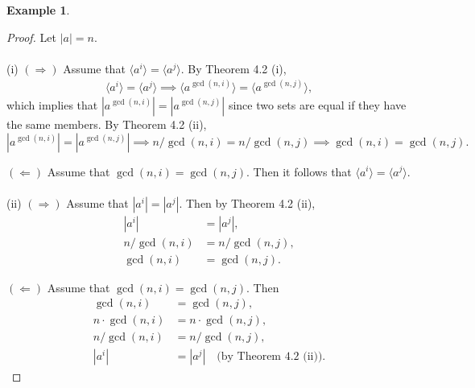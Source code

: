 \documentclass{article}
\newtheorem{corollary}{Corollary}[theorem]
\theoremstyle{definition}
\newtheorem{example}{Example}[section]
\begin{document}
\begin{example}
    \noindent{}
    \begin{proof}
        Let $|a|=n$.
        \\ \\
        (i) $(\Rightarrow)$ Assume that $\langle a^i \rangle = \langle a^j \rangle$. By Theorem 4.2 (i),
        \begin{align*}
            \langle a^i \rangle = \langle a^j \rangle \implies \langle a^{\gcd(n,i)} \rangle = \langle a^{\gcd(n,j)} \rangle,
        \end{align*}
        which implies that $|a^{\gcd(n,i)}| = |a^{\gcd(n,j)}|$ since two sets are equal if they have the same members. By Theorem 4.2 (ii),
        \begin{equation*}
            |a^{\gcd(n,i)}| = |a^{\gcd(n,j)}| \implies n/\gcd(n,i) = n/\gcd(n,j) \implies \gcd(n,i)=\gcd(n,j).
        \end{equation*}
        
        $(\Leftarrow)$ Assume that $\gcd(n,i)=\gcd(n,j)$. Then it follows that $\langle a^i \rangle = \langle a^j \rangle$.
        \\ \\
        (ii) $(\Rightarrow)$ Assume that $|a^i|=|a^j|$. Then by Theorem 4.2 (ii),
        \begin{align*}
            |a^i| &= |a^j|, \\
            n/\gcd(n,i) &= n/\gcd(n,j), \\
            \gcd(n,i) &= \gcd(n,j).
        \end{align*}
        
        $(\Leftarrow)$ Assume that $\gcd(n,i) = \gcd(n,j)$. Then
        \begin{align*}
            \gcd(n,i) &= \gcd(n,j), \\
            n \cdot \gcd(n,i) &= n \cdot \gcd(n,j), \\
            n/\gcd(n,i) &= n/\gcd(n,j), \\
            |a^i| &= |a^j| \quad \text{(by Theorem 4.2 (ii))}.
        \end{align*}
    \end{proof}
    

\end{example}
\end{document}
